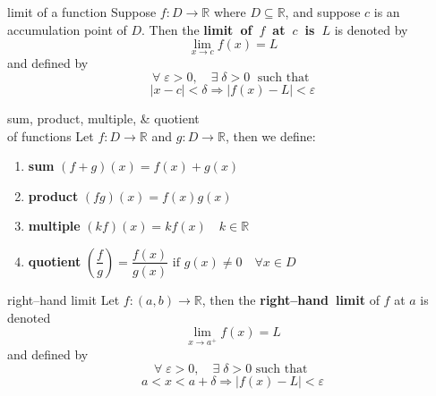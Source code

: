 \documentclass[avery5371,grid]{flashcards}
\newcommand{\R}{\mathbb{R}}
\newcommand{\st}{\textrm{ such that }}
\begin{document}

\begin{flashcard}[Definition]{limit of a function}
Suppose $f:D \rightarrow \R$ where $D \subseteq \R$, and suppose $c$ is 
an accumulation point of $D$.  Then the
\mbox{\textbf{limit of $f$ at $c$ is $L$}} is denoted by
\[ \lim_{x \rightarrow c} f(x) = L \]
and defined by
\begin{equation*}
\forall \; \varepsilon > 0, \quad \exists \; \delta > 0 \; \st
\end{equation*}
\begin{equation*}
|x-c| < \delta \Rightarrow |f(x) - L| < \varepsilon
\end{equation*}
\end{flashcard}

\begin{flashcard}[Definition]{sum, product, multiple, \& quotient\\
of functions}
Let $f:D \rightarrow \R$ and $g:D \rightarrow \R$, then we define:
\begin{enumerate}
 \item \textbf{sum} $(f+g)(x) = f(x) + g(x)$
 \item \textbf{product} $(fg)(x) = f(x)g(x)$
 \item \textbf{multiple} $(kf)(x) = kf(x) \quad k \in \R$
 \item \textbf{quotient} $\left( \dfrac{f}{g} \right) = \dfrac{f(x)}{g(x)}
\textrm{ if } g(x) \neq 0 \quad \forall x \in D$
\end{enumerate}
\end{flashcard}

\begin{flashcard}[Definition]{right--hand limit}
Let $f:(a,b) \rightarrow \R$, then the \mbox{\textbf{right--hand limit}}
of $f$ at $a$ is denoted \[\lim_{x \rightarrow a^{+}} f(x) = L \]
and defined by
\begin{equation*}
\forall \; \varepsilon > 0, \quad \exists \; \delta > 0 \st
\end{equation*}
\begin{equation*}
a < x < a + \delta \Rightarrow |f(x) - L| < \varepsilon
\end{equation*}
\end{flashcard}
\end{document}
